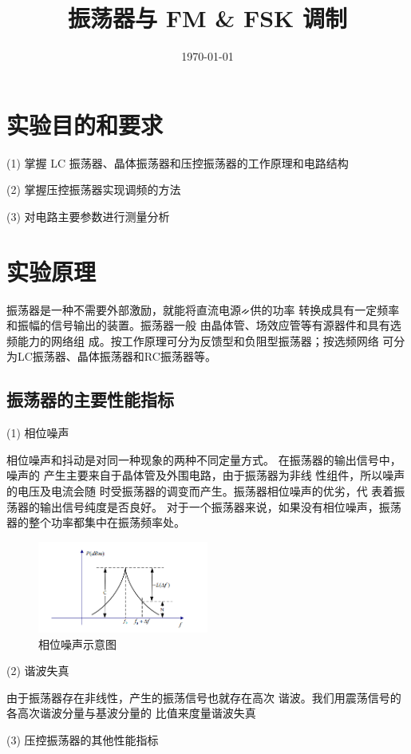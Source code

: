 \documentclass{../source/Experiment}
\title{振荡器与 FM \& FSK 调制}
\date{\today}
\begin{document}
\makecover
\makeheader
    \section{实验目的和要求}
    (1) 掌握 LC 振荡器、晶体振荡器和压控振荡器的工作原理和电路结构

    (2) 掌握压控振荡器实现调频的方法

    (3) 对电路主要参数进行测量分析


    \section{实验原理}
    振荡器是一种不需要外部激励，就能将直流电源ᨀ供的功率
    转换成具有一定频率和振幅的信号输出的装置。振荡器一般
    由晶体管、场效应管等有源器件和具有选频能力的网络组
    成。按工作原理可分为反馈型和负阻型振荡器；按选频网络
    可分为LC振荡器、晶体振荡器和RC振荡器等。

        \subsection{振荡器的主要性能指标}

        (1) 相位噪声
        
        相位噪声和抖动是对同一种现象的两种不同定量方式。
        在振荡器的输出信号中，噪声的
        产生主要来自于晶体管及外围电路，由于振荡器为非线
        性组件，所以噪声的电压及电流会随
        时受振荡器的调变而产生。振荡器相位噪声的优劣，代
        表着振荡器的输出信号纯度是否良好。
        对于一个振荡器来说，如果没有相位噪声，振荡器的整个功率都集中在振荡频率处。
        \begin{figure}[H]
            \centering
            \includegraphics[width = 0.5\textwidth]{lab3/1.png}
            \caption{相位噪声示意图}    
        \end{figure}
        
        (2) 谐波失真
        
        由于振荡器存在非线性，产生的振荡信号也就存在高次
        谐波。我们用震荡信号的各高次谐波分量与基波分量的
        比值来度量谐波失真

        (3) 压控振荡器的其他性能指标
\end{document}
